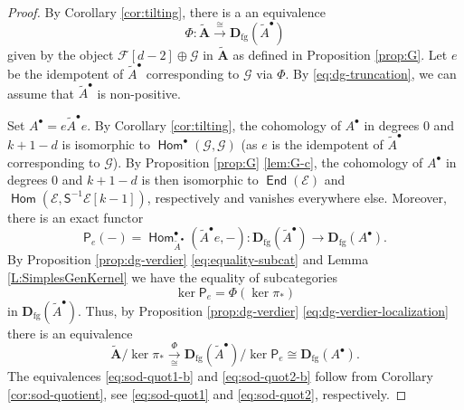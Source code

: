 \documentclass[a4paper,11pt, reqno]{amsart}
\def\AA{\mathbf A}
\def\DD{\mathbf D}
\def\sE{\mathscr{E}}
\def\sF{\mathscr{F}}
\def\sG{\mathscr{G}}
\newcommand{\opname}[1]{\operatorname{\mathsf{#1}}}
\newcommand{\Hom}{\opname{Hom}}
\newcommand{\End}{\opname{End}}
\newcommand{\bP}{\mathsf{P}}
\newcommand{\bS}{\mathsf{S}}
\theoremstyle{plain}
\theoremstyle{definition}
\numberwithin{equation}{section}
\newlength{\arrow}
\begin{document}
\begin{proof}
By Corollary \ref{cor:tilting}, there is a an equivalence
\[
\Phi \colon \tilde{\AA} \xrightarrow{\cong} \DD_{\mathrm{fg}} ( \tilde{A}^\bullet )
\]
given by the object $\sF[d-2] \oplus \sG $ in $\tilde{\AA}$ as defined in Proposition \ref{prop:G}.
Let $e$  be the idempotent of $\tilde{A}^\bullet$ corresponding to $\sG$ via $\Phi$.
By \eqref{eq:dg-truncation}, we can assume that $\tilde{A}^\bullet$ is non-positive. 

Set $A^\bullet = e\tilde{A}^\bullet e $.
By Corollary \ref{cor:tilting}, the cohomology of $A^\bullet $  in degrees $0$ and $k+1-d$ is isomorphic to $\Hom^\bullet ( \sG , \sG )$ (as $e$ is the idempotent of $\tilde{A}^\bullet $ corresponding to $\sG$). 
By Proposition \ref{prop:G} \ref{lem:G-c}, the cohomology of $A^\bullet$ in degrees $0$ and $k+1-d$ is then isomorphic to $\End ( \sE )$ and $\Hom ( \sE , \bS^{-1}\sE [k-1])$, respectively and vanishes everywhere else.
Moreover, there is an exact functor 
\[
\bP_e(-) = \Hom_{\tilde{A}^\bullet}^\bullet (\tilde{A}^\bullet e , -) \colon \DD_{\mathrm{fg}}(\tilde{A}^\bullet)\to \DD_{\mathrm{fg}}( A^\bullet ).
\]
By Proposition \ref{prop:dg-verdier} \eqref{eq:equality-subcat} and Lemma 
\ref{L:SimplesGenKernel} we have  the equality of subcategories
\[
\ker \bP_e = \Phi ( \ker \pi_\ast )
\]
in $\DD_{\mathrm{fg}} ( \tilde{A}^\bullet )$.
Thus, by Proposition \ref{prop:dg-verdier} \eqref{eq:dg-verdier-localization} there is an equivalence 
\[
\tilde{\AA} / \ker \pi_\ast \xrightarrow[\cong]{\Phi } \DD_{\mathrm{fg}} ( \tilde{A}^\bullet ) / \ker \bP_e  \cong \DD_{\mathrm{fg}}( A^\bullet  ).
\]
The equivalences \eqref{eq:sod-quot1-b} and \eqref{eq:sod-quot2-b} follow from Corollary \ref{cor:sod-quotient}, see \eqref{eq:sod-quot1} and \eqref{eq:sod-quot2}, respectively.
\end{proof}
\end{document}
